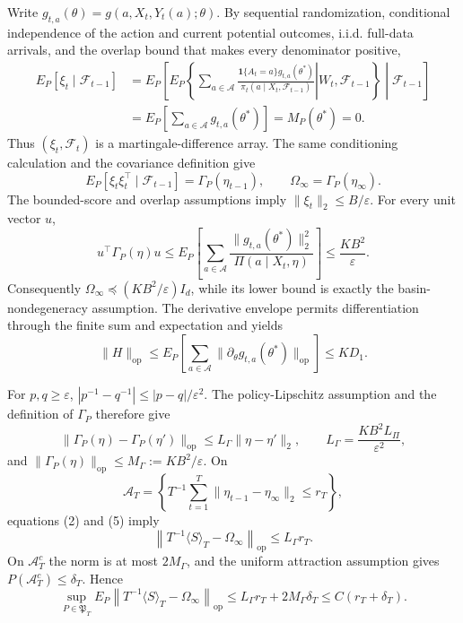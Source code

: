 Write \(g_{t,a}(\theta)=g(a,X_t,Y_t(a);\theta)\). By sequential randomization, conditional independence of the action and current potential outcomes, i.i.d. full-data arrivals, and the overlap bound that makes every denominator positive,
\[
\begin{aligned}
 E_P[\xi_t\mid\mathcal F_{t-1}]
 &=E_P\!\left[E_P\!\left\{\left.\sum_{a\in\mathcal A}
 \frac{\mathbf 1\{A_t=a\}g_{t,a}(\theta^*)}
 {\pi_t(a\mid X_t,\mathcal F_{t-1})}\right|W_t,\mathcal F_{t-1}\right\}\middle|\mathcal F_{t-1}\right]\nonumber\\
 &=E_P\!\left[\sum_{a\in\mathcal A}g_{t,a}(\theta^*)\right]
 =M_P(\theta^*)=0. \tag{1}
\end{aligned}
\]
Thus \((\xi_t,\mathcal F_t)\) is a martingale-difference array. The same conditioning calculation and the covariance definition give
\[
 E_P[\xi_t\xi_t^\top\mid\mathcal F_{t-1}]
 =\Gamma_P(\eta_{t-1}),
 \qquad \Omega_\infty=\Gamma_P(\eta_\infty). \tag{2}
\]
The bounded-score and overlap assumptions imply \(\|\xi_t\|_2\le B/\varepsilon\). For every unit vector \(u\),
\[
 u^\top\Gamma_P(\eta)u
 \le E_P\!\left[\sum_{a\in\mathcal A}
 \frac{\|g_{t,a}(\theta^*)\|_2^2}{\Pi(a\mid X_t,\eta)}\right]
 \le\frac{KB^2}{\varepsilon}. \tag{3}
\]
Consequently \(\Omega_\infty\preceq(KB^2/\varepsilon)I_d\), while its lower bound is exactly the basin-nondegeneracy assumption. The derivative envelope permits differentiation through the finite sum and expectation and yields
\[
 \|H\|_{\mathrm{op}}
 \le E_P\!\left[\sum_{a\in\mathcal A}
 \|\partial_\theta g_{t,a}(\theta^*)\|_{\mathrm{op}}\right]
 \le KD_1. \tag{4}
\]

For \(p,q\ge\varepsilon\), \(|p^{-1}-q^{-1}|\le|p-q|/\varepsilon^2\). The policy-Lipschitz assumption and the definition of \(\Gamma_P\) therefore give
\[
 \|\Gamma_P(\eta)-\Gamma_P(\eta')\|_{\mathrm{op}}
 \le L_\Gamma\|\eta-\eta'\|_2,
 \qquad L_\Gamma=\frac{KB^2L_\Pi}{\varepsilon^2}, \tag{5}
\]
and \(\|\Gamma_P(\eta)\|_{\mathrm{op}}\le M_\Gamma:=KB^2/\varepsilon\). On
\[
 \mathcal A_T=\left\{T^{-1}\sum_{t=1}^T
 \|\eta_{t-1}-\eta_\infty\|_2\le r_T\right\},
\]
equations (2) and (5) imply
\[
 \left\|T^{-1}\langle S\rangle_T-\Omega_\infty\right\|_{\mathrm{op}}
 \le L_\Gamma r_T. \tag{6}
\]
On \(\mathcal A_T^c\) the norm is at most \(2M_\Gamma\), and the uniform attraction assumption gives \(P(\mathcal A_T^c)\le\delta_T\). Hence
\[
 \sup_{P\in\mathfrak P_T}E_P\left\|T^{-1}\langle S\rangle_T-\Omega_\infty\right\|_{\mathrm{op}}
 \le L_\Gamma r_T+2M_\Gamma\delta_T
 \le C(r_T+\delta_T). \tag{7}
\]

